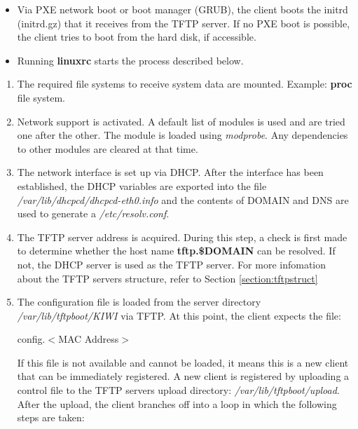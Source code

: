 \begin{itemize}
\item Via PXE network boot or boot manager (GRUB), the client boots the
      initrd (initrd.gz) that it receives from the TFTP server. If no PXE
      boot is possible, the client tries to boot from the hard
      disk, if accessible.
\item Running \textbf{linuxrc} starts the process described below.
\end{itemize}

\begin{enumerate}
	\item The required file systems to receive system data are mounted.
          Example: \textbf{proc} file system.
	\item Network support is activated. A default list of modules is
		  used and are tried one after the other. The module is loaded
		  using \textit{modprobe}. Any dependencies to other modules are
          cleared at that time.
	\item The network interface is set up via DHCP. After the interface has
          been established, the DHCP variables are exported into the file
          \textit{/var/lib/dhcpcd/dhcpcd-eth0.info} and the contents of
          DOMAIN and DNS are used to generate a \textit{/etc/resolv.conf}.
	\item The TFTP server address is acquired. During this step, a check
          is first made to determine whether the host name
          \textbf{tftp.\$DOMAIN} can be resolved. If not, the DHCP
          server is used as the TFTP server. For more infomation about the
          TFTP servers structure, refer to Section \ref{section:tftpstruct}
	\item The configuration file is loaded from the server directory
          \textit{/var/lib/tftpboot/KIWI} via TFTP. At this point, the client
          expects the file:

          \begin{Command}{8cm}
          config.$<$MAC Address$>$
          \end{Command}

          If this file is not available and cannot be loaded, it means this
          is a new client that can be immediately registered. A new client is
          registered by uploading a control file to the TFTP servers upload
          directory: \textit{/var/lib/tftpboot/upload}. After the upload, the client
          branches off into a loop in which the following steps are taken:


\end{enumerate}
